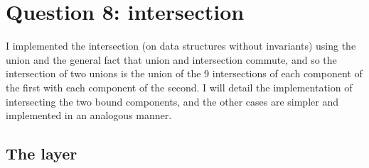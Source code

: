 \section{Question 8: intersection}

I implemented the intersection (on data structures without invariants)
using the union and the general fact that union and intersection commute, and so the
intersection of two unions is the union of the 9 intersections of each component of
the first with each component of the second.
%
I will detail the implementation of intersecting the two bound components, and the
other cases are simpler and implemented in an analogous manner.

\subsection{The  layer}

